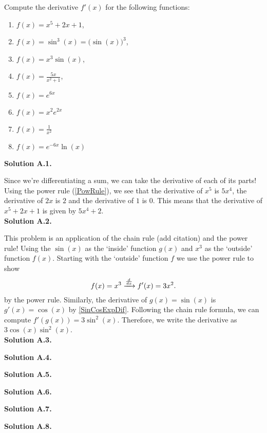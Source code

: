 \begin{exmps}

Compute the derivative $f'(x)$ for the following functions:
\begin{enumerate}[label=\textbf{Example A.\arabic*.}]
  \addtolength{\itemindent}{2.5cm} %
  \item \label{DifEA1} $f(x) = x^5+2x+1$,
  \item \label{DifEA2} $f(x) = \sin^3(x)=\big(\sin(x)\big)^3$,
  \item \label{DifEA3} $f(x) = x^3\sin(x)$,
  \item \label{DifEA4} $f(x) =\frac{5x}{x^2+1}$,
  \item \label{DifEA5} $f(x) = e^{6x}$
  \item \label{DifEA6} $f(x) = x^2e^{2x}$
  \item \label{DifEA7} $f(x) = \frac{1}{x^2}$
  \item \label{DifEA8} $f(x) = e^{-6x}\ln(x)$
\end{enumerate}

\textbf{Solution A.1.}

Since we're differentiating a sum, we can take the derivative of each of its parts! Using the power rule (\cref{PowRule}), we see that the derivative of $x^5$ is $5x^4$, the derivative of $2x$ is $2$ and the derivative of $1$ is 0. This means that the derivative of $x^5 + 2x + 1$ is given by $5x^4 + 2$.\\

\textbf{Solution A.2.}

This problem is an application of the chain rule (add citation) and the power rule! Using the $\sin(x)$ as the `inside' function $g(x)$ and $x^3$ as the `outside' function $f(x)$. Starting with the `outside' function $f$ we use the power rule to show
\[
f(x) = x^3 \xrightarrow{\frac{d }{d x}} f'(x) = 3x^2.
\] by the power rule. Similarly, the derivative of $g(x) = \sin(x)$ is $g'(x) = \cos(x)$ by \cref{SinCosExpDif}. Following the chain rule formula, we can compute $f'(g(x)) = 3 \sin^2(x)$. Therefore, we write the derivative as $3\cos(x)\sin^2(x)$.\\

\textbf{Solution A.3.}

\textbf{Solution A.4.}

\textbf{Solution A.5.}

\textbf{Solution A.6.}

\textbf{Solution A.7.}

\textbf{Solution A.8.}

\end{exmps}

